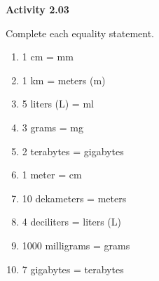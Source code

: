 \vspace{0.3ex}
\noindent\textbf{Activity 2.03}

\vspace{0.2ex}

Complete each equality statement.
\begin{multicols}{2}
\begin{enumerate}[noitemsep, label = \color{blue}\arabic*. ]
    \item 1 cm = \underline{\hspace{2em}} mm
    \item 1 km = \underline{\hspace{2em}} meters (m)
    \item 5 liters (L) = \underline{\hspace{2em}} ml
    \item 3 grams = \underline{\hspace{2em}} mg
    \item 2 terabytes = \underline{\hspace{2em}} gigabytes
    \item 1 meter = \underline{\hspace{2em}} cm
    \item 10 dekameters = \underline{\hspace{2em}} meters 
    \item 4 deciliters = \underline{\hspace{2em}} liters (L)
    \item 1000 milligrams = \underline{\hspace{2em}} grams
    \item 7 gigabytes = \underline{\hspace{2em}} terabytes
\end{enumerate}
\end{multicols}
